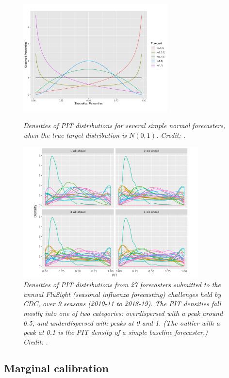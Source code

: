 \documentclass{article}
\begin{document}
\begin{figure}[p]
\centering
\includegraphics[width=0.7\textwidth]{pit1.png}
\vspace{-15pt}
\caption{\it Densities of PIT distributions for several simple normal
  forecasters, when the true target distribution is $N(0,1)$. Credit:
  \citet{rumack2022recalibrating}.}        
\label{fig:pit1}   

\bigskip\medskip

\includegraphics[width=0.85\textwidth]{pit2.png}
\caption{\it Densities of PIT distributions from 27 forecasters submitted to the
  annual FluSight (seasonal influenza forecasting) challenges held by CDC, over
  9 seasons (2010-11 to 2018-19). The PIT densities fall mostly into one of two
  categories: overdispersed with a peak around 0.5, and underdispersed with
  peaks at 0 and 1. (The outlier with a peak at 0.1 is the PIT density of a
  simple baseline forecaster.) Credit: \citet{rumack2022recalibrating}.}           
\label{fig:pit2}
\end{figure}

\subsection{Marginal calibration}
\end{document}

